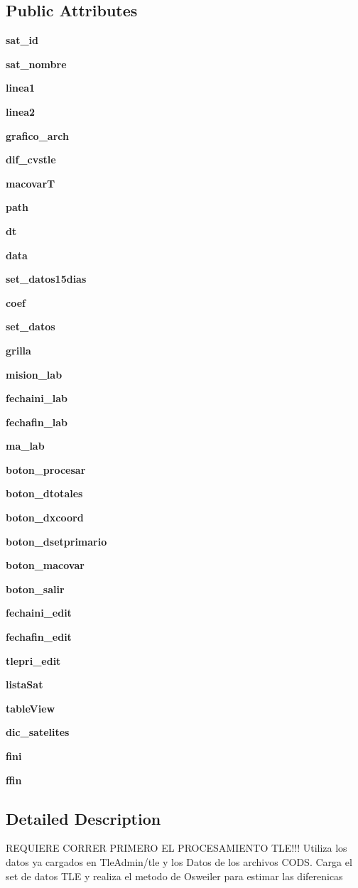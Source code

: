 \subsection*{\-Public \-Attributes}
\begin{DoxyCompactItemize}
\item 
{\bf sat\-\_\-id}
\item 
{\bf sat\-\_\-nombre}
\item 
{\bf linea1}
\item 
{\bf linea2}
\item 
{\bf grafico\-\_\-arch}
\item 
{\bf dif\-\_\-cvstle}
\item 
{\bf macovar\-T}
\item 
{\bf path}
\item 
{\bf dt}
\item 
{\bf data}
\item 
{\bf set\-\_\-datos15dias}
\item 
{\bf coef}
\item 
{\bf set\-\_\-datos}
\item 
{\bf grilla}
\item 
{\bf mision\-\_\-lab}
\item 
{\bf fechaini\-\_\-lab}
\item 
{\bf fechafin\-\_\-lab}
\item 
{\bf ma\-\_\-lab}
\item 
{\bf boton\-\_\-procesar}
\item 
{\bf boton\-\_\-dtotales}
\item 
{\bf boton\-\_\-dxcoord}
\item 
{\bf boton\-\_\-dsetprimario}
\item 
{\bf boton\-\_\-macovar}
\item 
{\bf boton\-\_\-salir}
\item 
{\bf fechaini\-\_\-edit}
\item 
{\bf fechafin\-\_\-edit}
\item 
{\bf tlepri\-\_\-edit}
\item 
{\bf lista\-Sat}
\item 
{\bf table\-View}
\item 
{\bf dic\-\_\-satelites}
\item 
{\bf fini}
\item 
{\bf ffin}
\end{DoxyCompactItemize}


\subsection{\-Detailed \-Description}
\begin{DoxyVerb}
REQUIERE CORRER PRIMERO EL PROCESAMIENTO TLE!!!
Utiliza los datos ya cargados en TleAdmin/tle y los Datos de los archivos CODS.
Carga el set de datos TLE y realiza el metodo de Osweiler para estimar las diferenicas
\end{DoxyVerb}
 

